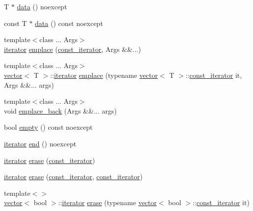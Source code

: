 \begin{DoxyCompactItemize}
\item 
T $\ast$ \mbox{\hyperlink{classvector_a9eaee4e9a7b7b5ea5372a3c7aae5b262}{data}} () noexcept
\item 
const T $\ast$ \mbox{\hyperlink{classvector_a350019eabadc6614a86aab52ae90af14}{data}} () const noexcept
\item 
{\footnotesize template$<$class ... Args$>$ }\\\mbox{\hyperlink{classvector_a35c955cacac6aacaa1e82874b1628865}{iterator}} \mbox{\hyperlink{classvector_a055780ddd711b193bc16b1b29c24d04f}{emplace}} (\mbox{\hyperlink{classvector_a2fc97dce62b7053449cc868607540dba}{const\+\_\+iterator}}, Args \&\&...)
\item 
{\footnotesize template$<$class ... Args$>$ }\\\mbox{\hyperlink{classvector}{vector}}$<$ T $>$\+::\mbox{\hyperlink{classvector_a35c955cacac6aacaa1e82874b1628865}{iterator}} \mbox{\hyperlink{classvector_a4dfbba201c3fd2ff82684d65993a7509}{emplace}} (typename \mbox{\hyperlink{classvector}{vector}}$<$ T $>$\+::\mbox{\hyperlink{classvector_a2fc97dce62b7053449cc868607540dba}{const\+\_\+iterator}} it, Args \&\&... args)
\item 
{\footnotesize template$<$class ... Args$>$ }\\void \mbox{\hyperlink{classvector_ac294eba73765b9a72a7399d64e8ecd9a}{emplace\+\_\+back}} (Args \&\&... args)
\item 
bool \mbox{\hyperlink{classvector_a3f6fc5de06a318920d84f3c3742db07f}{empty}} () const noexcept
\item 
\mbox{\hyperlink{classvector_a35c955cacac6aacaa1e82874b1628865}{iterator}} \mbox{\hyperlink{classvector_a035f0af279da4d1a1007d9df3ab05058}{end}} () noexcept
\item 
\mbox{\hyperlink{classvector_a35c955cacac6aacaa1e82874b1628865}{iterator}} \mbox{\hyperlink{classvector_ab7aae30d2341b7122fbe126517022f68}{erase}} (\mbox{\hyperlink{classvector_a2fc97dce62b7053449cc868607540dba}{const\+\_\+iterator}})
\item 
\mbox{\hyperlink{classvector_a35c955cacac6aacaa1e82874b1628865}{iterator}} \mbox{\hyperlink{classvector_a876bb8aa75029705c245a8a3a0c40ea3}{erase}} (\mbox{\hyperlink{classvector_a2fc97dce62b7053449cc868607540dba}{const\+\_\+iterator}}, \mbox{\hyperlink{classvector_a2fc97dce62b7053449cc868607540dba}{const\+\_\+iterator}})
\item 
{\footnotesize template$<$$>$ }\\\mbox{\hyperlink{classvector}{vector}}$<$ bool $>$\+::\mbox{\hyperlink{classvector_a35c955cacac6aacaa1e82874b1628865}{iterator}} \mbox{\hyperlink{classvector_aca1c34c08b059e077a84eb3505806b29}{erase}} (typename \mbox{\hyperlink{classvector}{vector}}$<$ bool $>$\+::\mbox{\hyperlink{classvector_a2fc97dce62b7053449cc868607540dba}{const\+\_\+iterator}} it)

\end{DoxyCompactItemize}
